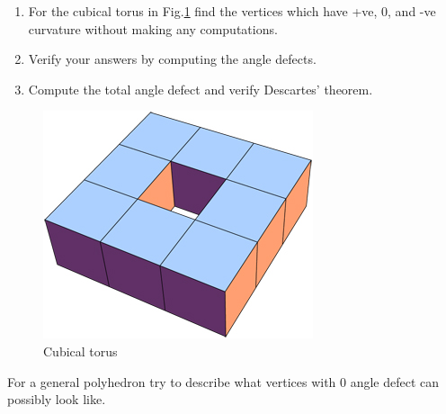 \begin{exercise}
	\begin{enumerate}
		\item For the cubical torus in Fig.\ref{cubical_torus} find the vertices which have +ve, 0, and -ve curvature without making any computations.
		\item Verify your answers by computing the angle defects.
		\item Compute the total angle defect and verify Descartes' theorem.
	\end{enumerate}
	\begin{figure}[H]
		\centering
		\includegraphics[width=0.25\linewidth]{images/torus_cube}
		\caption{Cubical torus}
		\label{cubical_torus}
	\end{figure}
\end{exercise}

\begin{exercise}
	For a general polyhedron try to describe what vertices with 0 angle defect can possibly look like.
\end{exercise}


